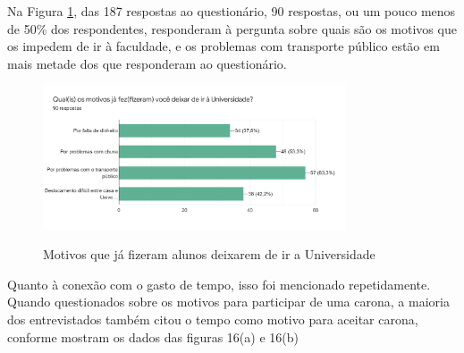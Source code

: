 Na Figura \ref{fig:motivos-nao-ir-a-unifao}, das 187 respostas ao questionário, 90 respostas, ou um pouco menos de 50\% dos respondentes, responderam à pergunta sobre quais são os motivos que os impedem de ir à faculdade, e os problemas com transporte público estão em mais metade dos que responderam ao questionário.

\begin{figure}[H]
	\centering
	\caption{Motivos que já fizeram alunos deixarem de ir a Universidade}
	\includegraphics[width=0.8\textwidth]{./04-figuras/questionario/12.png}
	\label{fig:motivos-nao-ir-a-unifao}
\end{figure}

Quanto à conexão com o gasto de tempo, isso foi mencionado repetidamente. Quando questionados sobre os motivos para participar de uma carona, a maioria dos entrevistados também citou o tempo como motivo para aceitar carona, conforme mostram os dados das figuras 16(a) e 16(b)

